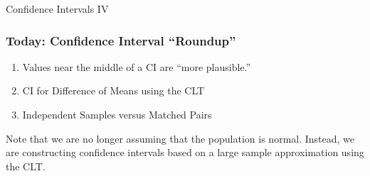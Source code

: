 \documentclass[handout]{beamer}
\date{Lecture 19}
\begin{document}
 





\begin{frame}[plain]
	\titlepage 
	

\end{frame} 



\begin{frame}
\begin{center}
\Huge Confidence Intervals IV
\end{center}
\end{frame}

\begin{frame}
\frametitle{Today: Confidence Interval ``Roundup''}

\begin{enumerate}
	\item Values near the middle of a CI are ``more plausible.''
	\item CI for Difference of Means using the CLT
	\item Independent Samples versus Matched Pairs
\end{enumerate}

\alert{Note that we are no longer assuming that the population is normal. Instead, we are constructing confidence intervals based on a large sample approximation using the CLT.}

\end{frame}
\end{document}
